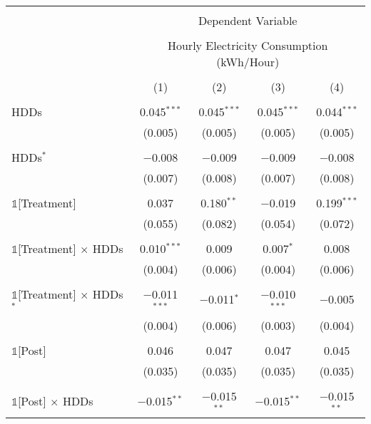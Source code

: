 
\begin{table}[!htbp] \centering 
  \label{Table:Breakdown-of-Average-Treatement-Effects_By-Tariff_17-to-20} 
\scriptsize
\begin{tabular}{@{\extracolsep{30pt}}lcccc} 
\\[-1.8ex]\hline 
\hline \\[-1.8ex] 
 & \multicolumn{4}{c}{Dependent Variable} \\ 
\cline{2-5} 
\\[-1.8ex] & \multicolumn{4}{c}{Hourly Electricity Consumption  (kWh/Hour)} \\ 
\\[-1.8ex] & (1) & (2) & (3) & (4)\\ 
\hline \\[-1.8ex] 
 HDDs & 0.045$^{***}$ & 0.045$^{***}$ & 0.045$^{***}$ & 0.044$^{***}$ \\ 
  & (0.005) & (0.005) & (0.005) & (0.005) \\ 
  & & & & \\ 
 HDDs$^{*}$ & $-$0.008 & $-$0.009 & $-$0.009 & $-$0.008 \\ 
  & (0.007) & (0.008) & (0.007) & (0.008) \\ 
  & & & & \\ 
 $\mathbb{1}$[Treatment] & 0.037 & 0.180$^{**}$ & $-$0.019 & 0.199$^{***}$ \\ 
  & (0.055) & (0.082) & (0.054) & (0.072) \\ 
  & & & & \\ 
 $\mathbb{1}$[Treatment] $\times$ HDDs & 0.010$^{***}$ & 0.009 & 0.007$^{*}$ & 0.008 \\ 
  & (0.004) & (0.006) & (0.004) & (0.006) \\ 
  & & & & \\ 
 $\mathbb{1}$[Treatment] $\times$ HDDs$^{*}$ & $-$0.011$^{***}$ & $-$0.011$^{*}$ & $-$0.010$^{***}$ & $-$0.005 \\ 
  & (0.004) & (0.006) & (0.003) & (0.004) \\ 
  & & & & \\ 
 $\mathbb{1}$[Post] & 0.046 & 0.047 & 0.047 & 0.045 \\ 
  & (0.035) & (0.035) & (0.035) & (0.035) \\ 
  & & & & \\ 
 $\mathbb{1}$[Post] $\times$ HDDs & $-$0.015$^{**}$ & $-$0.015$^{**}$ & $-$0.015$^{**}$ & $-$0.015$^{**}$ \\ 

\end{tabular}
\end{table}
